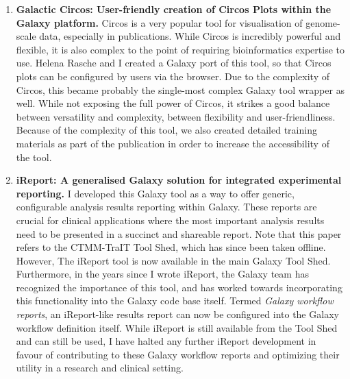 \begin{enumerate}[label=\ref{chapter:general}.\arabic*]
\item \textbf{Galactic Circos: User-friendly creation of Circos Plots within the Galaxy platform.} Circos is a very popular tool for visualisation of genome-scale data, especially in publications. While Circos is incredibly powerful and flexible, it is also complex to the point of requiring bioinformatics expertise to use. Helena Rasche and I created a Galaxy port of this tool, so that Circos plots can be configured by users via the browser. Due to the complexity of Circos, this became probably the single-most complex Galaxy tool wrapper as well. While not exposing the full power of Circos, it strikes a good balance between versatility and complexity, between flexibility and user-friendliness. Because of the complexity of this tool, we also created detailed training materials as part of the publication in order to increase the accessibility of the tool.


\item \textbf{iReport: A generalised Galaxy solution for integrated experimental reporting.} I developed this Galaxy tool as a way to offer generic, configurable analysis results reporting within Galaxy. These reports are crucial for clinical applications where the most important analysis results need to be presented in a succinct and shareable report. Note that this paper refers to the CTMM-TraIT Tool Shed, which has since been taken offline. However, The iReport tool is now available in the main Galaxy Tool Shed. Furthermore, in the years since I wrote iReport, the Galaxy team has recognized the importance of this tool, and has worked towards incorporating this functionality into the Galaxy code base itself. Termed \emph{Galaxy workflow reports}, an iReport-like results report can now be configured into the Galaxy workflow definition itself. While iReport is still available from the Tool Shed and can still be used, I have halted any further iReport development in favour of contributing to these Galaxy workflow reports and optimizing their utility in a research and clinical setting.
\end{enumerate}




